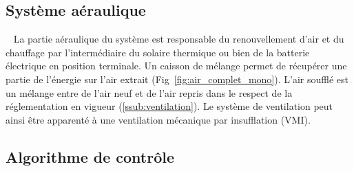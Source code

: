 

\subsection{Système aéraulique} %
\label{sub:systeme_aeraulique}
~
La partie aéraulique du système est responsable du renouvellement d’air et du chauffage
par l’intermédiaire du solaire thermique ou bien de la batterie électrique en
position terminale. Un caisson de mélange permet de récupérer une partie de l’énergie
sur l’air extrait (Fig~\ref{fig:air_complet_mono}). L’air soufflé est un mélange entre de l’air neuf et de l’air repris
dans le respect de la réglementation en vigueur (\ref{ssub:ventilation}).
Le système de ventilation peut ainsi être apparenté à une ventilation mécanique par insufflation
(VMI).





\subsection{Algorithme de contrôle} %
\label{sub:algorithme_de_controle}
~

